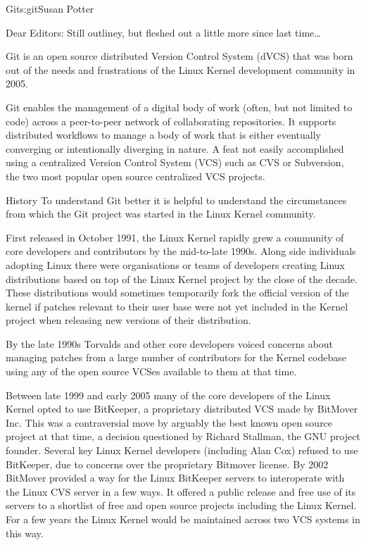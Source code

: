 \begin{aosachapter}{Git}{s:git}{Susan Potter}

Dear Editors: Still outliney, but fleshed out a little more since last time\ldots

Git is an open source distributed Version Control System (dVCS) that was
born out of the needs and frustrations of the Linux Kernel development
community in 2005.

Git enables the management of a digital body of work (often,
but not limited to code) across a peer-to-peer network of
collaborating repositories. It supports distributed workflows to
manage a body of work that is either eventually converging or
intentionally diverging in nature. A feat not easily accomplished
using a centralized Version Control System (VCS) such as CVS or
Subversion, the two most popular open source centralized VCS
projects.

\begin{aosasect1}{History}
To understand Git better it is helpful to understand the circumstances
from which the Git project was started in the Linux Kernel community.

First released in October 1991, the Linux Kernel rapidly grew a community
of core developers and contributors by the mid-to-late 1990s. Along side
individuals adopting Linux there were organisations or teams of developers
creating Linux distributions based on top of the Linux Kernel project by
the close of the decade. These distributions would sometimes temporarily
fork the official version of the kernel if patches relevant to their user
base were not yet included in the Kernel project when releasing new
versions of their distribution.

By the late 1990s Torvalds and other core developers voiced concerns
about managing patches from a large number of contributors for the
Kernel codebase using any of the open source VCSes available to them at
that time.

Between late 1999 and early 2005 many of the core developers of the Linux
Kernel opted to use BitKeeper, a proprietary distributed VCS made by
BitMover Inc. This was a contraversial move by arguably the best known open
source project at that time, a decision questioned by Richard Stallman, the
GNU project founder. Several key Linux Kernel developers (including Alan Cox)
refused to use BitKeeper, due to concerns over the proprietary Bitmover
license. By 2002 BitMover provided a way for the Linux BitKeeper servers to
interoperate with the Linux CVS server in a few ways. It offered a
public release and free use of its servers to a shortlist of free and
open source projects including the Linux Kernel. For a few years the
Linux Kernel would be maintained across two VCS systems in this way.


\end{aosasect1}
\end{aosachapter}
